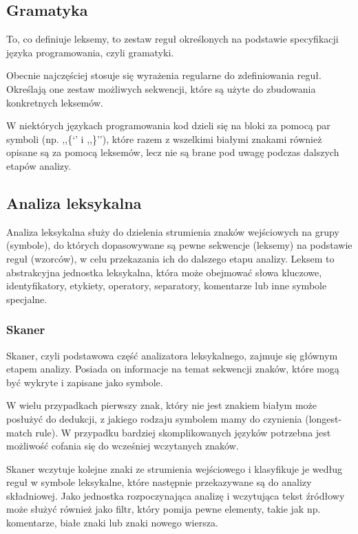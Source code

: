 \documentclass[a4paper,12pt]{article}
\begin{document}
\subsection{Gramatyka}

To, co definiuje leksemy, to zestaw reguł określonych na podstawie specyfikacji języka programowania, czyli gramatyki.

Obecnie najczęściej stosuje się wyrażenia regularne do zdefiniowania reguł. Określają one zestaw możliwych sekwencji, które są użyte do zbudowania konkretnych leksemów.

W niektórych językach programowania kod dzieli się na bloki za pomocą par symboli (np. ,,\{‘’ i ,,\}’’), które razem z wszelkimi białymi znakami również opisane są za pomocą leksemów, lecz nie są brane pod uwagę podczas dalszych etapów analizy.

\subsection{Analiza leksykalna}

Analiza leksykalna służy do dzielenia strumienia znaków wejściowych na grupy (symbole), do których dopasowywane są pewne sekwencje (leksemy) na podstawie reguł (wzorców), w celu przekazania ich do dalszego etapu analizy. Leksem to abstrakcyjna jednostka leksykalna, która może obejmować słowa kluczowe, identyfikatory, etykiety, operatory, separatory, komentarze lub inne symbole specjalne.

\subsubsection{Skaner}

Skaner, czyli podstawowa część analizatora leksykalnego, zajmuje się głównym etapem analizy. Posiada on informacje na temat sekwencji znaków, które mogą być wykryte i zapisane jako symbole.

W wielu przypadkach pierwszy znak, który nie jest znakiem białym może posłużyć do dedukcji, z jakiego rodzaju symbolem mamy do czynienia (longest-match rule). W przypadku bardziej skomplikowanych języków potrzebna jest możliwość cofania się do wcześniej wczytanych znaków.

Skaner wczytuje kolejne znaki ze strumienia wejściowego i klasyfikuje je według reguł w symbole leksykalne, które następnie przekazywane są do analizy składniowej. Jako jednostka rozpoczynająca analizę i wczytująca tekst źródłowy może służyć również jako filtr, który pomija pewne elementy, takie jak np. komentarze, białe znaki lub znaki nowego wiersza.
\end{document}
